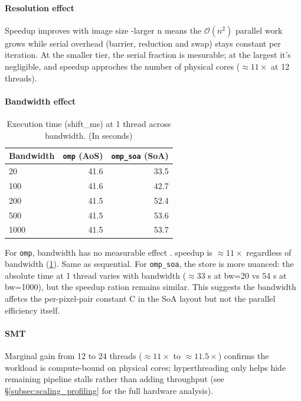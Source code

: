 \documentclass[10pt,twocolumn,letterpaper]{article}
\begin{document}
\paragraph{Resolution effect}
Speedup improves with image size -larger n means the $\mathcal O(n^2)$ parallel work grows while serial overhead (barrier, reduction and swap) stays constant per iteration. At the smaller tier, the serial fraction is mesurable; at the largest it's negligible, and speedup approches the number of physical cores ($\approx 11\times$ at 12 threads).

\paragraph{Bandwidth effect}
\begin{table}
\centering
\caption{Execution time (shift\_ms) at 1 thread across bandwidth. (In seconds)}
\label{tab:bw_dependency}
\begin{tabular}{l r r}
\toprule
Bandwidth & \texttt{omp} (AoS) & \texttt{omp\_soa} (SoA) \\
\midrule
20     & 41.6 & 33.5 \\
100    & 41.6 & 42.7 \\
200    & 41.5 & 52.4 \\
500    & 41.5 & 53.6 \\
1000   & 41.5 & 53.7 \\
\bottomrule
\end{tabular}
\end{table}
For \texttt{omp}, bandwidth has no measurable effect . speedup is $\approx 11\times$ regardless of bandwidth (\cref{tab:bw_dependency}). Same as sequential. For \texttt{omp\_soa}, the store is more nuanced: the absolute time at 1 thread varies with bandwidth ($\approx 33$ s at bw=20 vs $54$ s at bw=1000), but the speedup ration remains similar. This suggests the bandwidth affetcs the per-pixel-pair constant C in the SoA layout but not the parallel efficiency itself.
\paragraph{SMT}
Marginal gain from 12 to 24 threads ($\approx 11\times$ to $\approx 11.5\times$) confirms the workload is compute-bound on physical cores; hyperthreading only helps hide remaining pipeline stalls rather than adding throughput (see \S\cref{subsec:scaling_profiling} for the full hardware analysis).
\end{document}
